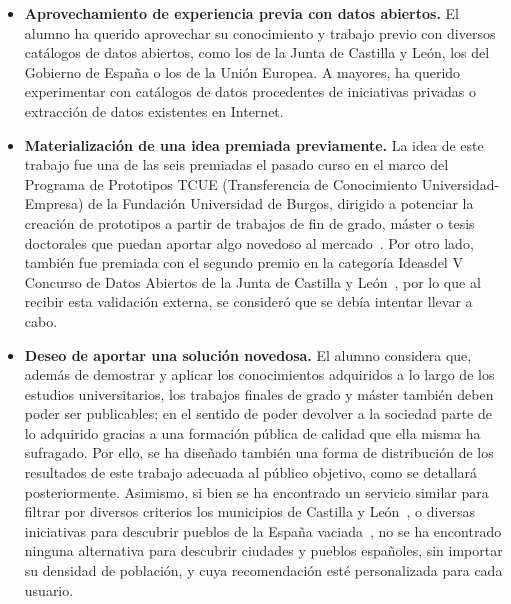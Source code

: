 \begin{itemize}
    \item \textbf{Aprovechamiento de experiencia previa con datos abiertos.} El alumno ha querido aprovechar su conocimiento y trabajo previo con diversos catálogos de datos abiertos, como los de la Junta de Castilla y León, los del Gobierno de España o los de la Unión Europea. A mayores, ha querido experimentar con catálogos de datos procedentes de iniciativas privadas o extracción de datos existentes en Internet.
    \item \textbf{Materialización de una idea premiada previamente.} La idea de este trabajo fue una de las seis premiadas el pasado curso en el marco del Programa de Prototipos TCUE (Transferencia de Conocimiento Universidad-Empresa) de la Fundación Universidad de Burgos, dirigido a potenciar la creación de prototipos a partir de trabajos de fin de grado, máster o tesis doctorales que puedan aportar algo novedoso al mercado~\cite{ubu}. Por otro lado, también fue premiada con el segundo premio en la categoría \guillemotleft Ideas\guillemotright\space del V Concurso de Datos Abiertos de la Junta de Castilla y León~\cite{cyl}, por lo que al recibir esta validación externa, se consideró que se debía intentar llevar a cabo. 
    \item \textbf{Deseo de aportar una solución novedosa.} El alumno considera que, además de demostrar y aplicar los conocimientos adquiridos a lo largo de los estudios universitarios, los trabajos finales de grado y máster también deben poder ser publicables; en el sentido de poder devolver a la sociedad parte de lo adquirido gracias a una formación pública de calidad que ella misma ha sufragado. Por ello, se ha diseñado también una forma de distribución de los resultados de este trabajo adecuada al público objetivo, como se detallará posteriormente. Asimismo, si bien se ha encontrado un servicio similar para filtrar por diversos criterios los municipios de Castilla y León~\cite{repueblame}, o diversas iniciativas para descubrir pueblos de la España vaciada~\cite{apadrina_un_pueblo, pueblos_magicos}, no se ha encontrado ninguna alternativa para descubrir ciudades y pueblos españoles, sin importar su densidad de población, y cuya recomendación esté personalizada para cada usuario.
 \end{itemize}
